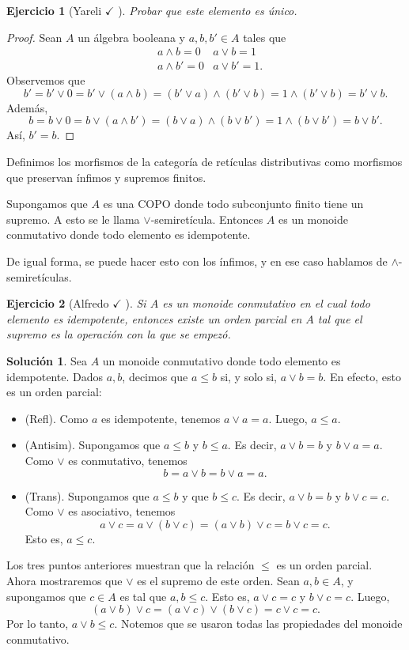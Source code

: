 \documentclass[12pt,letterpaper,titlepage]{article}
\newtheorem{exe}{Ejercicio}
\theoremstyle{definition}
\newtheorem*{sol}{Solución}
\renewcommand\sup{\vee}
\renewcommand\inf{\wedge}
\newcommand\<{\langle}
\renewcommand\>{\rangle}
\begin{document}
\begin{exe}[Yareli $\checkmark$ ]
  Probar que este elemento es único.
\end{exe}
\begin{proof}
  Sean $A$ un álgebra booleana y $a,b,b'\in A$ tales que
\begin{align*}
&a\wedge b=0 &a\vee b=1\\
&a\wedge b'=0 &a\vee b'=1.
\end{align*}
Observemos que 
\[b'=b'\vee 0=b'\vee (a \wedge b)=(b'\vee a)\wedge (b'\vee b)=1\wedge (b'\vee b)=b'\vee b.\]
Además,
\[b=b\vee 0=b\vee (a\wedge b')=(b\vee a)\wedge (b\vee b')=1\wedge (b\vee b')=b\vee b'.\]
Así, $b'=b$.
\end{proof}



Definimos los morfismos de la categoría de retículas
distributivas como morfismos que preservan ínfimos y supremos
finitos.

Supongamos que $A$ es una COPO donde todo subconjunto finito
tiene un supremo.
A esto se le llama $\sup$-semiretícula.
Entonces $A$ es un monoide conmutativo donde todo elemento es
idempotente.

De igual forma, se puede hacer esto con los ínfimos, y en ese
caso hablamos de $\inf$-semiretículas.

\begin{exe}[Alfredo $\checkmark$ ]
  Si $A$ es un monoide conmutativo en el cual todo elemento es
  idempotente, entonces existe un orden parcial en $A$ tal que el
  supremo es la operación con la que se empezó.
\end{exe}
\begin{sol}
    Sea $A$ un monoide conmutativo donde todo elemento es idempotente.
    Dados $a,b$, decimos que $a\leq b$ si, y solo si, $a\sup b=b$.
    En efecto, esto es un orden parcial:
    \begin{itemize}
        \item (Refl). Como $a$ es idempotente, tenemos $a\sup a=a$.
        Luego, $a\leq a$.
        \item (Antisim). Supongamos que $a\leq b$ y $b\leq a$.
        Es decir, $a\sup b=b$ y $b\sup a=a$.
        Como $\sup$ es conmutativo, tenemos
        \[
            b = a\sup b = b\sup a = a
        .\]
        \item (Trans). Supongamos que $a\leq b$ y que $b\leq c$.
        Es decir, $a\sup b = b$ y $b\sup c = c$.
        Como $\sup$ es asociativo, tenemos
        \[
            a\sup c = a\sup(b\sup c) = (a\sup b)\sup c = b\sup c = c
        .\]
        Esto es, $a\leq c$.
    \end{itemize}
    Los tres puntos anteriores muestran que la relación $\leq$ es
    un orden parcial.
    Ahora mostraremos que $\sup$ es el supremo de este orden.
    Sean $a,b\in A$, y supongamos que $c\in A$ es tal que $a,b\leq c$.
    Esto es, $a\sup c = c$ y $b\sup c = c$.
    Luego,
    \[
        (a\sup b)\sup c = (a\sup c)\sup(b\sup c) = c\sup c = c
    .\]
    Por lo tanto, $a\sup b\leq c$.
    Notemos que se usaron todas las propiedades del monoide conmutativo.
\end{sol}
\end{document}
